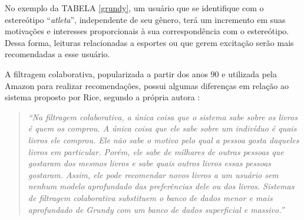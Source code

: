 No exemplo da TABELA \ref{grundy}, um usuário que se identifique com o estereótipo
``\textit{atleta}'', independente de seu gênero, terá um incremento em suas
motivações e interesses proporcionais à sua correspondência com o estereótipo.
Dessa forma, leituras relacionadas a esportes ou que gerem excitação serão
mais recomendadas a esse usuário.

A filtragem colaborativa, popularizada a partir dos anos 90 e utilizada pela
Amazon \cite{amazon2017} para realizar recomendações,
possui algumas diferenças em relação ao sistema proposto por Rice, segundo a
própria autora \cite{rich:homepage}:

\begin{quotation}\small\noindent \textit{``Na filtragem colaborativa, a única
   coisa que o sistema sabe sobre os livros é quem os comprou. A única coisa que
   ele sabe sobre um indivíduo é quais livros ele comprou. Ele não sabe o motivo
   pelo qual a pessoa gosta daqueles livros em particular. Porém, ele sabe de
   milhares de outras pessoas que gostaram dos mesmos livros e sabe quais outros
   livros essas pessoas gostaram. Assim, ele pode recomendar novos livros a um
   usuário sem nenhum modelo aprofundado das preferências dele ou dos livros.
   Sistemas de filtragem colaborativa substituem o banco de dados menor e mais
   aprofundado de Grundy com um banco de dados superficial e massivo.''}
   \end{quotation}
